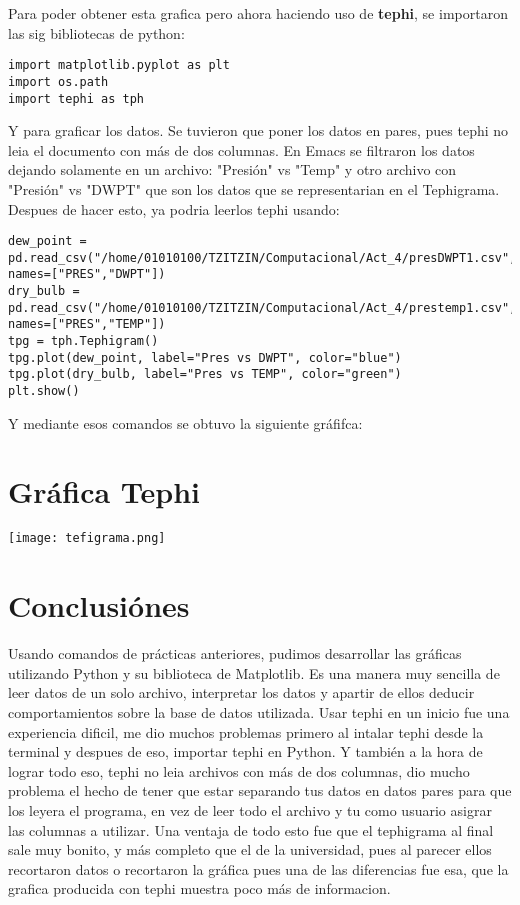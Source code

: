 \documentclass[12pt]{article}
\begin{document}
Para poder obtener esta grafica pero ahora haciendo uso de \textbf{tephi}, se importaron las sig bibliotecas de python: 
\begin{verbatim}
import matplotlib.pyplot as plt
import os.path
import tephi as tph
\end{verbatim}
Y para graficar los datos. Se tuvieron que poner los datos en pares, pues tephi no leia el documento con más de dos columnas. En Emacs se filtraron los datos dejando solamente en un archivo: "Presión" vs "Temp" y otro archivo con "Presión" vs "DWPT" que son los datos que se representarian en el Tephigrama. Despues de hacer esto, ya podria leerlos tephi usando: 
\pagebreak
\begin{verbatim}
dew_point = pd.read_csv("/home/01010100/TZITZIN/Computacional/Act_4/presDWPT1.csv", names=["PRES","DWPT"])
dry_bulb = pd.read_csv("/home/01010100/TZITZIN/Computacional/Act_4/prestemp1.csv", names=["PRES","TEMP"])
tpg = tph.Tephigram()
tpg.plot(dew_point, label="Pres vs DWPT", color="blue")
tpg.plot(dry_bulb, label="Pres vs TEMP", color="green")
plt.show()
\end{verbatim}
Y mediante esos comandos se obtuvo la siguiente gráfifca:
\section*{Gráfica Tephi}
\begin{center}
\texttt{[image: tefigrama.png]}
\end{center}

\pagebreak
\section{Conclusiónes}
Usando comandos de prácticas anteriores, pudimos desarrollar las gráficas utilizando Python y su biblioteca de Matplotlib. Es una manera muy sencilla de leer datos de un solo archivo, interpretar los datos y apartir de ellos deducir comportamientos sobre la base de datos utilizada.
Usar tephi en un inicio fue una experiencia dificil, me dio muchos problemas primero al intalar tephi desde la terminal y despues de eso, importar tephi en Python. Y también a la hora de lograr todo eso, tephi no leia archivos con más de dos columnas, dio mucho problema el hecho de tener que estar separando tus datos en datos pares para que los leyera el programa, en vez de leer todo el archivo y tu como usuario asigrar las columnas a utilizar. Una ventaja de todo esto fue que el tephigrama al final sale muy bonito, y más completo que el de la universidad, pues al parecer ellos recortaron datos o recortaron la gráfica pues una de las diferencias fue esa, que la grafica producida con tephi muestra poco más de informacion. 
\end{document}
